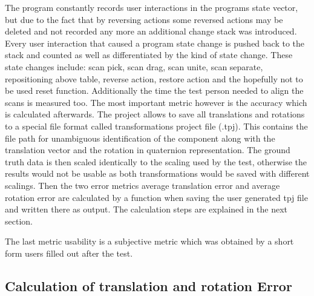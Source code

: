\documentclass[hyperref,english,bachelorofscience,bibnum,twoside]{cgvpub}
\begin{document}
The program constantly records user interactions in the programs state vector, but due to the fact that by reversing actions some reversed actions may be deleted and not recorded any more an additional change stack was introduced. Every user interaction that caused a program state change is pushed back to the stack and counted as well as differentiated by the kind of state change. These state changes include: scan pick, scan drag, scan unite, scan separate, repositioning above table, reverse action, restore action and the hopefully not to be used reset function.
Additionally the time the test person needed to align the scans is measured too.
The most important metric however is the accuracy which is calculated afterwards. The project allows to save all translations and rotations to a special file format called transformations project file (.tpj). This contains the file path for unambiguous identification of the component along with the translation vector and the rotation in quaternion representation. The ground truth data is then scaled identically to the scaling used by the test, otherwise the results would not be usable as both transformations would be saved with different scalings.
Then the two error metrics average translation error and average rotation error are calculated by a function when saving the user generated tpj file and written there as output. The calculation steps are explained in the next section.

The last metric usability is a subjective metric which was obtained by a short form users filled out after the test. 

\subsection{Calculation of translation and rotation Error}
\end{document}
